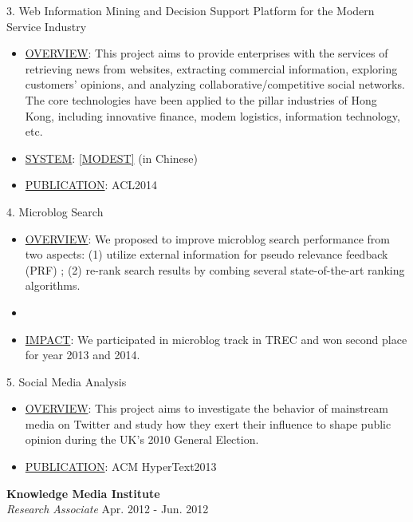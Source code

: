 \documentclass[9.5pt]{article}
\begin{document}
3. Web Information Mining and Decision Support Platform for the Modern Service Industry
\begin{itemize}
\itemsep-0.2em
	\item \underline{OVERVIEW}: This project aims to provide enterprises with the services of retrieving news from websites, extracting commercial information, exploring customers' opinions, and analyzing collaborative/competitive social networks. The core technologies have been applied to the pillar industries of Hong Kong, including innovative finance, modem logistics, information technology, etc. 
	\item \underline{SYSTEM}: \href{http://sepc111.se.cuhk.edu.hk:8080/modest}{[MODEST]} (in Chinese)
	\item \underline{PUBLICATION}: ACL2014
\end{itemize}

4. Microblog Search
\begin{itemize}
\itemsep-0.2em
	\item \underline{OVERVIEW}: We proposed to improve microblog search performance from two aspects: (1) utilize external information for pseudo relevance feedback (PRF) ; (2) re-rank search results by combing several state-of-the-art ranking algorithms.  
	\item {}
	\item \underline{IMPACT}: We participated in microblog track in TREC and won second place for year 2013 and 2014. 
\end{itemize}

5. Social Media Analysis
\begin{itemize}
\itemsep-0.2em
	\item \underline{OVERVIEW}: This project aims to investigate the behavior of mainstream media on Twitter and study how they exert their influence to shape public opinion during the UK's 2010 General Election.
	\item \underline{PUBLICATION}: ACM HyperText2013
\end{itemize}

\vspace{10pt}
\textbf{Knowledge Media Institute}\\
\emph{Research Associate} \hfill Apr. 2012 - Jun. 2012\\
\end{document}
